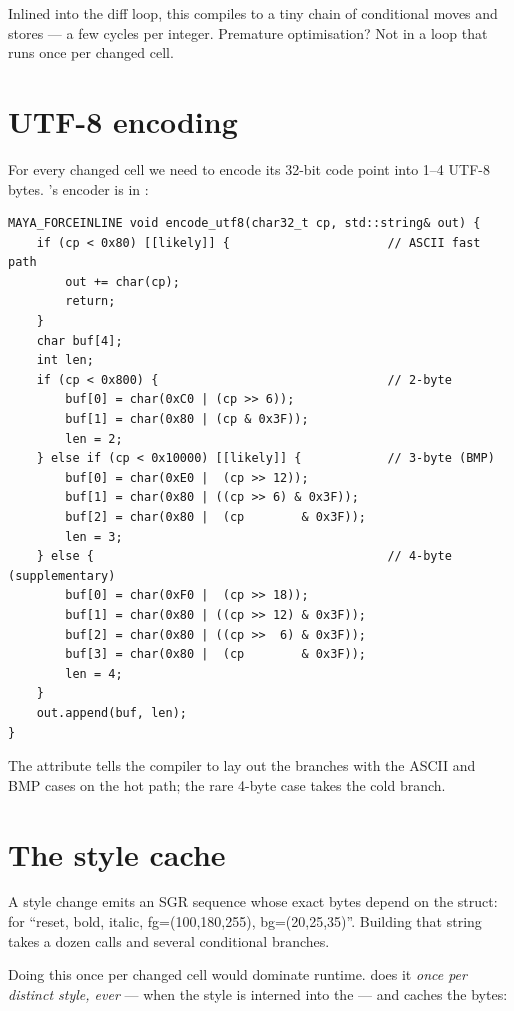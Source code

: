 Inlined into the diff loop, this compiles to a tiny chain of
conditional moves and stores --- a few cycles per integer. Premature
optimisation? Not in a loop that runs once per changed cell.

\section{UTF-8 encoding}

For every changed cell we need to encode its 32-bit code point into
1--4 UTF-8 bytes. \maya{}'s encoder is in :

\begin{lstlisting}
MAYA_FORCEINLINE void encode_utf8(char32_t cp, std::string& out) {
    if (cp < 0x80) [[likely]] {                      // ASCII fast path
        out += char(cp);
        return;
    }
    char buf[4];
    int len;
    if (cp < 0x800) {                                // 2-byte
        buf[0] = char(0xC0 | (cp >> 6));
        buf[1] = char(0x80 | (cp & 0x3F));
        len = 2;
    } else if (cp < 0x10000) [[likely]] {            // 3-byte (BMP)
        buf[0] = char(0xE0 |  (cp >> 12));
        buf[1] = char(0x80 | ((cp >> 6) & 0x3F));
        buf[2] = char(0x80 |  (cp        & 0x3F));
        len = 3;
    } else {                                         // 4-byte (supplementary)
        buf[0] = char(0xF0 |  (cp >> 18));
        buf[1] = char(0x80 | ((cp >> 12) & 0x3F));
        buf[2] = char(0x80 | ((cp >>  6) & 0x3F));
        buf[3] = char(0x80 |  (cp        & 0x3F));
        len = 4;
    }
    out.append(buf, len);
}
\end{lstlisting}

The \code{[[likely]]} attribute tells the compiler to lay out the
branches with the ASCII and BMP cases on the hot path; the rare
4-byte case takes the cold branch.

\section{The style cache}

A style change emits an SGR sequence whose exact bytes depend on the
 struct: \code{ESC[0;1;3;38;2;100;180;255;48;2;20;25;35m}
for ``reset, bold, italic, fg=(100,180,255), bg=(20,25,35)''. Building
that string takes a dozen  calls and several
conditional branches.

Doing this once per changed cell would dominate runtime. \maya{} does
it \emph{once per distinct style, ever} --- when the style is
interned into the  --- and caches the bytes:

